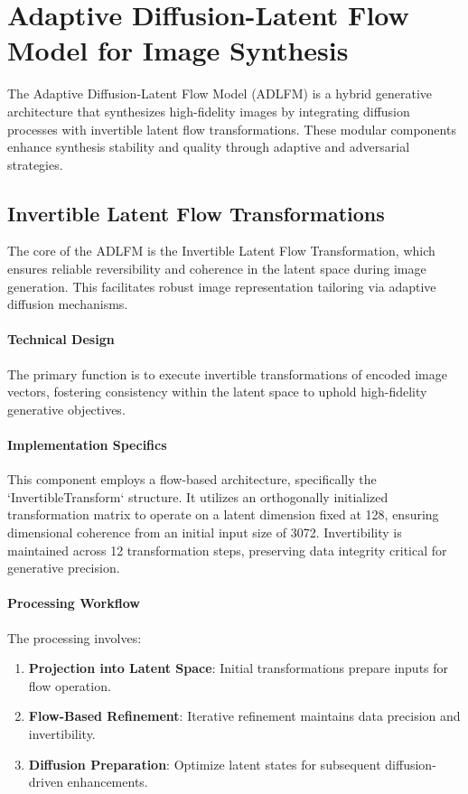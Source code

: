 \section{Adaptive Diffusion-Latent Flow Model for Image Synthesis}

The Adaptive Diffusion-Latent Flow Model (ADLFM) is a hybrid generative architecture that synthesizes high-fidelity images by integrating diffusion processes with invertible latent flow transformations. These modular components enhance synthesis stability and quality through adaptive and adversarial strategies.

\subsection{Invertible Latent Flow Transformations}

The core of the ADLFM is the Invertible Latent Flow Transformation, which ensures reliable reversibility and coherence in the latent space during image generation. This facilitates robust image representation tailoring via adaptive diffusion mechanisms.

\paragraph{Technical Design}

The primary function is to execute invertible transformations of encoded image vectors, fostering consistency within the latent space to uphold high-fidelity generative objectives.

\paragraph{Implementation Specifics}

This component employs a flow-based architecture, specifically the `InvertibleTransform` structure. It utilizes an orthogonally initialized transformation matrix to operate on a latent dimension fixed at 128, ensuring dimensional coherence from an initial input size of 3072. Invertibility is maintained across 12 transformation steps, preserving data integrity critical for generative precision.

\paragraph{Processing Workflow}

The processing involves:
\begin{enumerate}
    \item \textbf{Projection into Latent Space}: Initial transformations prepare inputs for flow operation.
    \item \textbf{Flow-Based Refinement}: Iterative refinement maintains data precision and invertibility.
    \item \textbf{Diffusion Preparation}: Optimize latent states for subsequent diffusion-driven enhancements.
\end{enumerate}

